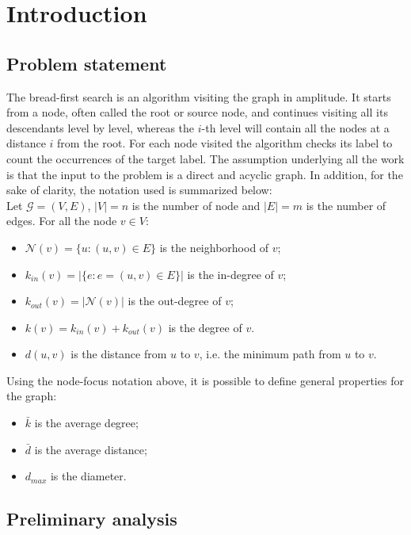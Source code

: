 
\section{Introduction}
\subsection{Problem statement}
The bread-first search is an algorithm visiting the graph in amplitude. It starts from a node, 
often called the root or source node, and continues visiting all its descendants level
by level, whereas the $i$-th level will contain all the nodes at a distance $i$ from the root.
For each node visited the algorithm checks its label to count the occurrences of the target label.
The assumption underlying all the work is that the input to the problem is a direct and 
acyclic graph. In addition, for the sake of clarity, the notation used is summarized below:
\\

Let $\mathcal{G} = (V, E)$, $|V| = n$ is the number of node and $|E| = m$ is the number of edges. 
For all the node $v \in V$:
\begin{itemize}
    \item $\mathcal{N}(v) = \{u : (u, v) \in E\}$ is the neighborhood of $v$;
    \item $k_{in}(v) = |\{e: e=(u, v) \in E\}|$ is the in-degree of $v$;
    \item $k_{out}(v) = |\mathcal{N}(v)|$ is the out-degree of $v$;
    \item $k(v) = k_{in}(v) + k_{out}(v)$ is the degree of $v$.
    \item $d(u, v)$ is the distance from $u$ to $v$, i.e. the minimum path from $u$ to $v$.
\end{itemize}
Using the node-focus notation above,
 it is possible to define general properties for the graph:
\begin{itemize}
    \item $\bar{k}$ is the average degree;
    \item $\bar{d}$ is the average distance;
    \item $d_{max}$ is the diameter.
\end{itemize}

\subsection{Preliminary analysis}
